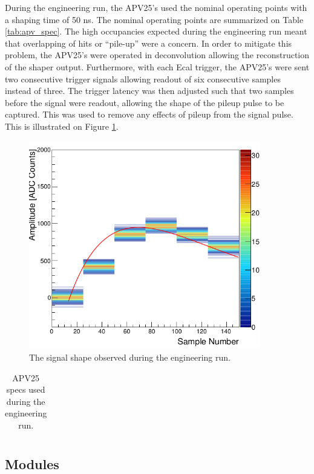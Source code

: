 During the engineering run, the APV25's used the nominal  operating points with
a shaping time of 50 ns.  The nominal operating points are summarized on Table
\ref{tab:apv_spec}. The high occupancies expected during the engineering
run meant that overlapping of hits or ``pile-up'' were a concern.  In order to 
mitigate this problem, the APV25's were operated in deconvolution allowing 
the reconstruction of the shaper output.  Furthermore, 
with each Ecal trigger, the APV25's were sent two consecutive trigger signals 
allowing readout of six consecutive samples instead of three.  The trigger
latency was then adjusted such that two samples before the signal were readout, 
allowing the shape of the pileup pulse to be captured.  This was used to remove
any effects of pileup from the signal pulse.  This is illustrated on Figure 
\ref{fig:apv_shape}.
\begin{figure}
    \centering
    \includegraphics[width=0.9\textwidth]{images/sideB_response_ch535.png}
    \caption{The signal shape observed during the engineering run.}
    \label{fig:apv_shape}
\end{figure}
\begin{table}[t]
    \centering
    \begin{tabular}{l|c}
        \hline
        \hline
    \end{tabular}
    \caption{APV25 specs used during the engineering run.}
    \label{tab:apv_specs}
\end{table}

\subsection{Modules}

